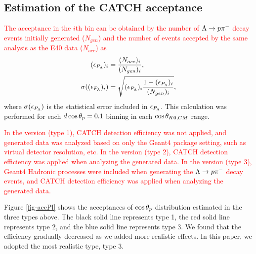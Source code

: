 

\subsection{Estimation of the CATCH acceptance}
\label{sec-Pl-esteff}

\textcolor{red}{ The acceptance in the $i$th bin can be obtained by the number of $\Lambda\to p\pi^{-}$ decay events initially generated ($N_{gen}$) and the number of events accepted by the same analysis as the E40 data ($N_{acc}$) as }
\begin{align}
  (\epsilon_{P_{\Lambda}})_i &= \frac{(N_{acc})_i}{(N_{gen})_i}, \\
  \sigma((\epsilon_{P_{\Lambda}})_i) &= \sqrt{(\epsilon_{P_{\Lambda}})_i \frac{1-(\epsilon_{P_{\Lambda}})_i}{(N_{gen})_i}},
  \label{eq-accPL}
\end{align}
where $\sigma(\epsilon_{P_{\Lambda}})$ is the statistical error included in $\epsilon_{P_{\Lambda}}$. This calculation was performed for each $d\cos{\theta_p}=0.1$ binning in each $\cos{\theta_{K0,CM}}$ range.

\textcolor{red}{ In the  version (type 1), CATCH detection efficiency was not applied, and generated data was analyzed based on only the Geant4 package setting, such as virtual detector resolution, etc. In the  version (type 2), CATCH detection efficiency was applied when analyzing the generated data. In the  version (type 3), Geant4 Hadronic processes were included when generating the $\Lambda\to p\pi^{-}$ decay events, and CATCH detection efficiency was applied when analyzing the generated data. }

Figure \ref{fig-accPl} shows the acceptances of $\cos{\theta_p}$ distribution estimated in the three types above. The black solid line represents type 1, the red solid line represents type 2, and the blue solid line represents type 3. We found that the efficiency gradually decreased as we added more realistic effects. In this paper, we adopted the most realistic type, type 3. %


